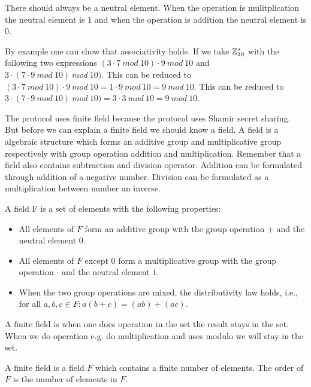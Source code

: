  There should always be a neutral element. When the operation is mulitplication the neutral element is $1$ and when the operation is addition the neutral element is $0$.

 By example one can show that associativity holds. If we take $ \mathbb{Z}_{10}^*$ with the following two expressions $ (3 \cdot 7 \ mod \ 10) \cdot 9 \ mod \ 10 $ and  $ 3 \cdot ( 7 \cdot 9 \ mod \ 10) \ mod \ 10) $. This can be reduced to $ (3 \cdot 7 \ mod \ 10) \cdot 9 \ mod \ 10 = 1 \cdot 9 \ mod \ 10 = 9 \ mod \ 10$. This can be reduced to $ 3 \cdot ( 7 \cdot 9 \ mod \ 10) \ mod \ 10) = 3 \cdot 3 \ mod \ 10 = 9 \ mod \ 10 $.


 The protocol uses finite field because the protocol uses Shamir secret sharing. But before we can explain a finite field we should know a field. A field is a  algebraic structure which forms an additive group and multiplicative group  respectively with group operation addition and multiplication. Remember that a field also contains subtraction and division operator. Addition can be formulated through addition of a negative number. Division can be formulated as a multiplication between number an inverse.  
\begin{defi}
A field F is a set of elements with the following properties:
\begin{itemize}
\item  All elements of $F$ form an additive group with the group operation $+$ and the neutral element $0$.
\item  All elements of $F$ except $0$ form a multiplicative group with the group operation $ \cdot $ and the neutral element $1$.
\item When the two group operations are mixed, the distributivity law holds, i.e., for all $a,b,c \in F: a(b+c) = (ab)+(ac)$.
\end{itemize}
\end{defi}
 A finite field is when one does operation in the set the result stays in the set. When we do operation e.g. do multiplication and uses modulo we will stay in the set.
\begin{defi}
A finite field is a field $F$ which contains a finite number of elements. The order of $F$ is the number of elements in $F$.
\end{defi}

